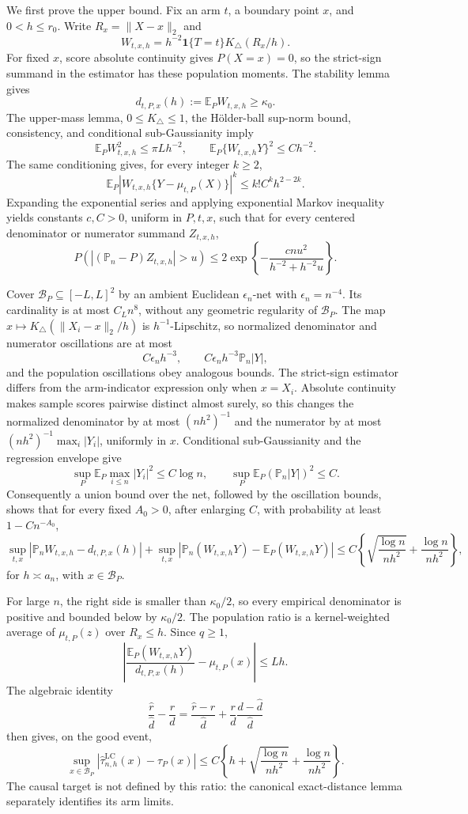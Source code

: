 We first prove the upper bound.  Fix an arm \(t\), a boundary point \(x\), and \(0<h\leq r_0\).  Write \(R_x=\lVert X-x\rVert_2\) and
\[
 W_{t,x,h}=h^{-2}\mathbf1\{T=t\}K_\triangle(R_x/h).
\]
For fixed \(x\), score absolute continuity gives \(P(X=x)=0\), so the strict-sign summand in the estimator has these population moments.  The stability lemma gives
\[
 d_{t,P,x}(h):=\mathbb E_PW_{t,x,h}\geq\kappa_0.
\]
The upper-mass lemma, \(0\leq K_\triangle\leq1\), the H\"older-ball sup-norm bound, consistency, and conditional sub-Gaussianity imply
\[
 \mathbb E_PW_{t,x,h}^2\leq \pi Lh^{-2},
 \qquad
 \mathbb E_P\{W_{t,x,h}Y\}^2\leq Ch^{-2}.
\]
The same conditioning gives, for every integer \(k\geq2\),
\[
 \mathbb E_P|W_{t,x,h}\{Y-\mu_{t,P}(X)\}|^k
 \leq k!C^k h^{2-2k}.
\]
Expanding the exponential series and applying exponential Markov inequality yields constants \(c,C>0\), uniform in \(P,t,x\), such that for every centered denominator or numerator summand \(Z_{t,x,h}\),
\[
 P\!\left(\left|(\mathbb P_n-P)Z_{t,x,h}\right|>u\right)
 \leq2\exp\!\left\{-\frac{cnu^2}{h^{-2}+h^{-2}u}\right\}.
\]

Cover \(\mathcal B_P\subseteq[-L,L]^2\) by an ambient Euclidean \(\epsilon_n\)-net with \(\epsilon_n=n^{-4}\).  Its cardinality is at most \(C_Ln^8\), without any geometric regularity of \(\mathcal B_P\).  The map \(x\mapsto K_\triangle(\lVert X_i-x\rVert_2/h)\) is \(h^{-1}\)-Lipschitz, so normalized denominator and numerator oscillations are at most
\[
 C\epsilon_nh^{-3},
 \qquad C\epsilon_nh^{-3}\mathbb P_n|Y|,
\]
and the population oscillations obey analogous bounds.  The strict-sign estimator differs from the arm-indicator expression only when \(x=X_i\).  Absolute continuity makes sample scores pairwise distinct almost surely, so this changes the normalized denominator by at most \((nh^2)^{-1}\) and the numerator by at most \((nh^2)^{-1}\max_i|Y_i|\), uniformly in \(x\).  Conditional sub-Gaussianity and the regression envelope give
\[
 \sup_P\mathbb E_P\max_{i\leq n}|Y_i|^2\leq C\log n,
 \qquad
 \sup_P\mathbb E_P(\mathbb P_n|Y|)^2\leq C.
\]
Consequently a union bound over the net, followed by the oscillation bounds, shows that for every fixed \(A_0>0\), after enlarging \(C\), with probability at least \(1-Cn^{-A_0}\),
\[
 \sup_{t,x}|\mathbb P_nW_{t,x,h}-d_{t,P,x}(h)|
 +\sup_{t,x}|\mathbb P_n(W_{t,x,h}Y)-\mathbb E_P(W_{t,x,h}Y)|
 \leq C\left\{\sqrt{\frac{\log n}{nh^2}}+\frac{\log n}{nh^2}\right\},
\]
for \(h\asymp a_n\), with \(x\in\mathcal B_P\).

For large \(n\), the right side is smaller than \(\kappa_0/2\), so every empirical denominator is positive and bounded below by \(\kappa_0/2\).  The population ratio is a kernel-weighted average of \(\mu_{t,P}(z)\) over \(R_x\leq h\).  Since \(q\geq1\),
\[
 \left|\frac{\mathbb E_P(W_{t,x,h}Y)}{d_{t,P,x}(h)}-\mu_{t,P}(x)\right|
 \leq Lh.
\]
The algebraic identity
\[
 \frac{\widehat r}{\widehat d}-\frac r d
 =\frac{\widehat r-r}{\widehat d}
 +\frac r d\frac{d-\widehat d}{\widehat d}
\]
then gives, on the good event,
\[
 \sup_{x\in\mathcal B_P}
 |\widehat\tau^{\mathrm{LC}}_{n,h}(x)-\tau_P(x)|
 \leq C\left\{h+\sqrt{\frac{\log n}{nh^2}}+\frac{\log n}{nh^2}\right\}.
\]
The causal target is not defined by this ratio: the canonical exact-distance lemma separately identifies its arm limits.

